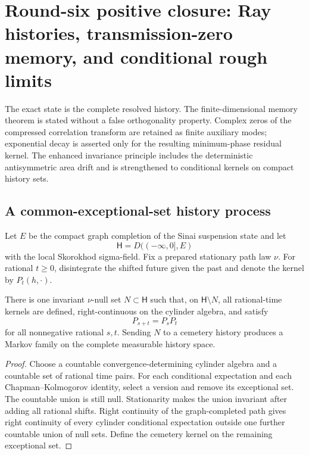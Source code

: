 \section{Round-six positive closure: Ray histories, transmission-zero memory, and conditional rough limits}
\label{sec:r6-a4}

The exact state is the complete resolved history.  The finite-dimensional
memory theorem is stated without a false orthogonality property.  Complex
zeros of the compressed correlation transform are retained as finite auxiliary
modes; exponential decay is asserted only for the resulting minimum-phase
residual kernel.  The enhanced invariance principle includes the deterministic
antisymmetric area drift and is strengthened to conditional kernels on compact
history sets.

\subsection{A common-exceptional-set history process}

Let \(E\) be the compact graph completion of the Sinai suspension state and
let
\[
\mathsf H=D(( -\infty,0],E)
\]
with the local Skorokhod sigma-field.  Fix a prepared stationary path law
\(\nu\).  For rational \(t\ge0\), disintegrate the shifted future given the
past and denote the kernel by \(P_t(h,\cdot)\).

\begin{lemma}
\label{lem:r6-a4-kernels}
There is one invariant \(\nu\)-null set \(N\subset\mathsf H\) such that, on
\(\mathsf H\setminus N\), all rational-time kernels are defined,
right-continuous on the cylinder algebra, and satisfy
\[
P_{s+t}=P_sP_t
\]
for all nonnegative rational \(s,t\).  Sending \(N\) to a cemetery history
produces a Markov family on the complete measurable history space.
\end{lemma}

\begin{proof}
Choose a countable convergence-determining cylinder algebra and a countable
set of rational time pairs.  For each conditional expectation and each
Chapman--Kolmogorov identity, select a version and remove its exceptional set.
The countable union is still null.  Stationarity makes the union invariant
after adding all rational shifts.  Right continuity of the graph-completed
path gives right continuity of every cylinder conditional expectation outside
one further countable union of null sets.  Define the cemetery kernel on the
remaining exceptional set.
\end{proof}

